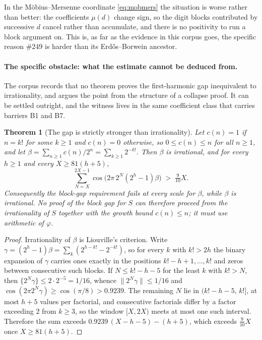 \documentclass[11pt]{article}
\theoremstyle{plain}
\newtheorem{thm}{Theorem}[section]
\theoremstyle{definition}
\theoremstyle{remark}
\begin{document}
In the M\"obius--Mersenne coordinate \eqref{eq:mobmers} the situation is
worse rather than better: the coefficients $\mu(d)$ change sign, so the
digit blocks contributed by successive $d$ cancel rather than accumulate,
and there is no positivity to run a block argument on. This is, as far as
the evidence in this corpus goes, the specific reason \#249 is harder than
its Erd\H{o}s--Borwein ancestor.

\paragraph{The specific obstacle: what the estimate cannot be deduced from.}
The corpus records that no theorem proves the first-harmonic gap
inequivalent to irrationality, and argues the point from the structure of a
collapse proof. It can be settled outright, and the witness lives in the
same coefficient class that carries barriers B1 and B7.

\begin{thm}[The gap is strictly stronger than irrationality]\label{thm:lacunary}
Let $c(n)=1$ if $n=k!$ for some $k\ge 1$ and $c(n)=0$ otherwise, so
$0\le c(n)\le n$ for all $n\ge 1$, and let $\beta=\sum_{n\ge1}c(n)/2^{n}
=\sum_{k\ge 1}2^{-k!}$. Then $\beta$ is irrational, and for every $h\ge 1$
and every $X\ge 81(h+5)$,
\[
  \sum_{N=X}^{2X-1}\cos\bigl(2\pi\,2^{N}(2^{h}-1)\beta\bigr) \;>\; \tfrac{9}{10}X .
\]
Consequently the block-gap requirement fails at \emph{every} scale for
$\beta$, while $\beta$ is irrational. No proof of the block gap for $S$ can
therefore proceed from the irrationality of $S$ together with the growth
bound $c(n)\le n$; it must use arithmetic of $\varphi$.
\end{thm}

\begin{proof}
Irrationality of $\beta$ is Liouville's criterion. Write
$\gamma=(2^{h}-1)\beta=\sum_{k}(2^{h-k!}-2^{-k!})$, so for every $k$ with
$k!>2h$ the binary expansion of $\gamma$ carries ones exactly in the
positions $k!-h+1,\dots,k!$ and zeros between consecutive such blocks. If
$N\le k!-h-5$ for the least $k$ with $k!>N$, then
$\{2^{N}\gamma\}\le 2\cdot 2^{-5}=1/16$, whence $\|2^{N}\gamma\|\le 1/16$ and
$\cos(2\pi 2^{N}\gamma)\ge\cos(\pi/8)>0.9239$. The remaining $N$ lie in
$(k!-h-5,\,k!]$, at most $h+5$ values per factorial, and consecutive
factorials differ by a factor exceeding $2$ from $k\ge 3$, so the window
$[X,2X)$ meets at most one such interval. Therefore the sum exceeds
$0.9239\,(X-h-5)-(h+5)$, which exceeds $\tfrac{9}{10}X$ once
$X\ge 81(h+5)$.
\end{proof}
\end{document}

